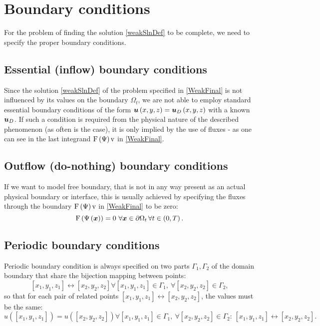 \section{Boundary conditions}
\label{section:bcs}
For the problem of finding the solution \ref{weakSlnDef} to be complete, we need to specify the proper boundary conditions.
\subsection{Essential (inflow) boundary conditions}

Since the solution \ref{weakSlnDef} of the problem specified in \ref{WeakFinal} is not influenced by its values on the boundary $\Omega_t$, we are not able to employ standard essential boundary conditions of the form $\mbox{\boldmath $u$}\left(x, y, z\right) = \mbox{\boldmath $u$}_D\left(x, y, z\right)$ with a known $\mbox{\boldmath $u$}_D$.
If such a condition is required from the physical nature of the described phenomenon (as often is the case), it is only implied by the use of fluxes - as one can see in the last integrand $\mathrm{F}\left(\mathrm{\Psi}\right) \mathrm{v}$ in \ref{WeakFinal}.


\subsection{Outflow (do-nothing) boundary conditions}
If we want to model free boundary, that is not in any way present as an actual physical boundary or interface, this is usually achieved by specifying the fluxes through the boundary $\mathrm{F}\left(\mathrm{\Psi}\right) \mathrm{v}$ in \ref{WeakFinal} to be zero:
$$
\mathrm{F}\lo\mathrm{\Psi}\lo\bfx\ro\ro = 0\ \forall\bfx\in\partial\Omega_t\, \forall t\in \lo0, T\ro.
$$


\subsection{Periodic boundary conditions}
Periodic boundary condition is always specified on two parts $\Gamma_1, \Gamma_2$ of the domain boundary that share the bijection mapping between points:
$$
\left[x_1, y_1, z_1\right] \leftrightarrow \left[x_2, y_2, z_2\right] \forall \left[x_1, y_1, z_1\right] \in \Gamma_1,\ \forall \left[x_2, y_2, z_2\right] \in \Gamma_2,
$$
so that for each pair of related points $\left[x_1, y_1, z_1\right] \leftrightarrow \left[x_2, y_2, z_2\right]$, the values must be the same:
$$
u\left(\left[x_1, y_1, z_1\right]\right) = u\left(\left[x_2, y_2, z_2\right]\right) \forall \left[x_1, y_1, z_1\right] \in \Gamma_1,\ \forall \left[x_2, y_2, z_2\right] \in \Gamma_2:\, \left[x_1, y_1, z_1\right] \leftrightarrow \left[x_2, y_2, z_2\right].
$$
